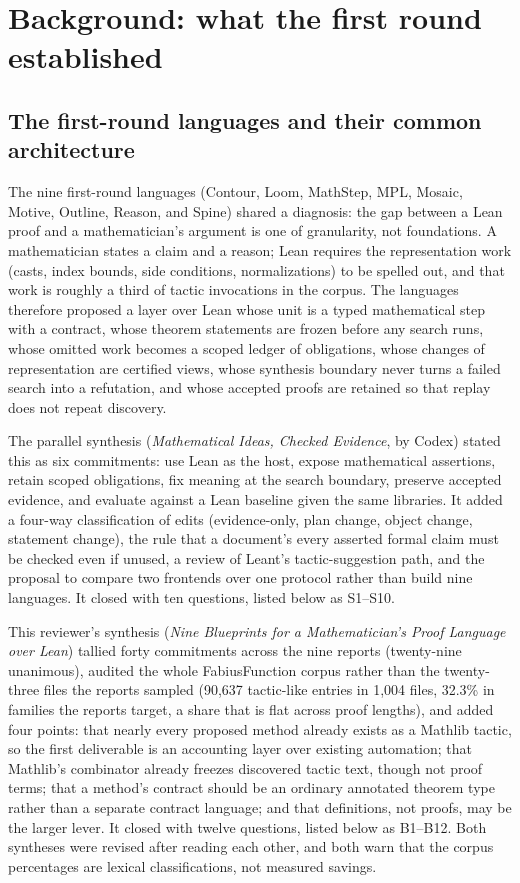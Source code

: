 \documentclass[11pt,a4paper]{article}
\newcommand{\code}[1]{\texttt{\detokenize{#1}}}
\theoremstyle{definition}
\begin{document}
\section{Background: what the first round established}\label{sec:background}

\subsection{The first-round languages and their common architecture}
The nine first-round languages (Contour, Loom, MathStep, MPL, Mosaic, Motive, Outline, Reason, and Spine) shared a diagnosis: the gap between a Lean proof and a mathematician's argument is one of granularity, not foundations. A mathematician states a claim and a reason; Lean requires the representation work (casts, index bounds, side conditions, normalizations) to be spelled out, and that work is roughly a third of tactic invocations in the corpus. The languages therefore proposed a layer over Lean whose unit is a typed mathematical step with a contract, whose theorem statements are frozen before any search runs, whose omitted work becomes a scoped ledger of obligations, whose changes of representation are certified views, whose synthesis boundary never turns a failed search into a refutation, and whose accepted proofs are retained so that replay does not repeat discovery.

The parallel synthesis (\emph{Mathematical Ideas, Checked Evidence}, by Codex) stated this as six commitments: use Lean as the host, expose mathematical assertions, retain scoped obligations, fix meaning at the search boundary, preserve accepted evidence, and evaluate against a Lean baseline given the same libraries. It added a four-way classification of edits (evidence-only, plan change, object change, statement change), the rule that a document's every asserted formal claim must be checked even if unused, a review of Leant's tactic-suggestion path, and the proposal to compare two frontends over one protocol rather than build nine languages. It closed with ten questions, listed below as S1--S10.

This reviewer's synthesis (\emph{Nine Blueprints for a Mathematician's Proof Language over Lean}) tallied forty commitments across the nine reports (twenty-nine unanimous), audited the whole FabiusFunction corpus rather than the twenty-three files the reports sampled (90,637 tactic-like entries in 1,004 files, 32.3\% in families the reports target, a share that is flat across proof lengths), and added four points: that nearly every proposed method already exists as a Mathlib tactic, so the first deliverable is an accounting layer over existing automation; that Mathlib's \code{says} combinator already freezes discovered tactic text, though not proof terms; that a method's contract should be an ordinary annotated theorem type rather than a separate contract language; and that definitions, not proofs, may be the larger lever. It closed with twelve questions, listed below as B1--B12. Both syntheses were revised after reading each other, and both warn that the corpus percentages are lexical classifications, not measured savings.
\end{document}
